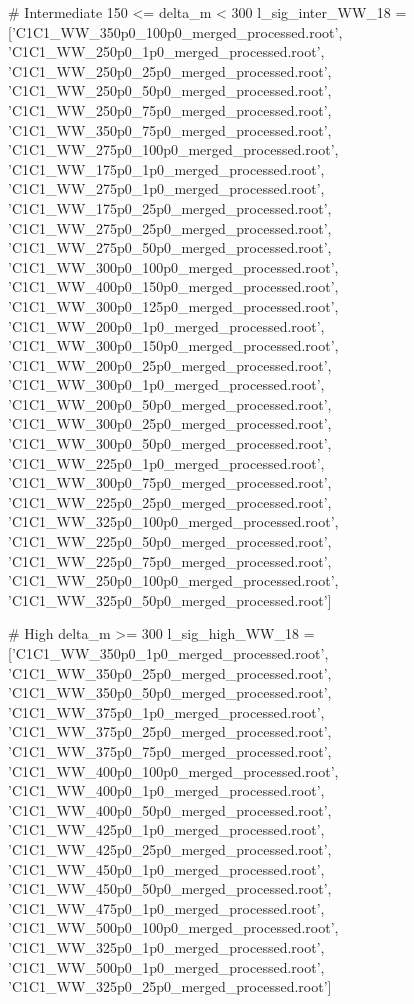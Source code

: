 # Intermediate 150 <= delta_m < 300
l_sig_inter_WW_18 = ['C1C1_WW_350p0_100p0_merged_processed.root',
                  'C1C1_WW_250p0_1p0_merged_processed.root',
                  'C1C1_WW_250p0_25p0_merged_processed.root',
                  'C1C1_WW_250p0_50p0_merged_processed.root',
                  'C1C1_WW_250p0_75p0_merged_processed.root',
                  'C1C1_WW_350p0_75p0_merged_processed.root',
                  'C1C1_WW_275p0_100p0_merged_processed.root',
                  'C1C1_WW_175p0_1p0_merged_processed.root',
                  'C1C1_WW_275p0_1p0_merged_processed.root',
                  'C1C1_WW_175p0_25p0_merged_processed.root',
                  'C1C1_WW_275p0_25p0_merged_processed.root',
                  'C1C1_WW_275p0_50p0_merged_processed.root',
                  'C1C1_WW_300p0_100p0_merged_processed.root',
                  'C1C1_WW_400p0_150p0_merged_processed.root',
                  'C1C1_WW_300p0_125p0_merged_processed.root',
                  'C1C1_WW_200p0_1p0_merged_processed.root',
                  'C1C1_WW_300p0_150p0_merged_processed.root',
                  'C1C1_WW_200p0_25p0_merged_processed.root',
                  'C1C1_WW_300p0_1p0_merged_processed.root',
                  'C1C1_WW_200p0_50p0_merged_processed.root',
                  'C1C1_WW_300p0_25p0_merged_processed.root',
                  'C1C1_WW_300p0_50p0_merged_processed.root',
                  'C1C1_WW_225p0_1p0_merged_processed.root',
                  'C1C1_WW_300p0_75p0_merged_processed.root',
                  'C1C1_WW_225p0_25p0_merged_processed.root',
                  'C1C1_WW_325p0_100p0_merged_processed.root',
                  'C1C1_WW_225p0_50p0_merged_processed.root',
                  'C1C1_WW_225p0_75p0_merged_processed.root',
                  'C1C1_WW_250p0_100p0_merged_processed.root',
                  'C1C1_WW_325p0_50p0_merged_processed.root']

# High delta_m >= 300
l_sig_high_WW_18 = ['C1C1_WW_350p0_1p0_merged_processed.root',
                 'C1C1_WW_350p0_25p0_merged_processed.root',
                 'C1C1_WW_350p0_50p0_merged_processed.root',
                 'C1C1_WW_375p0_1p0_merged_processed.root',
                 'C1C1_WW_375p0_25p0_merged_processed.root',
                 'C1C1_WW_375p0_75p0_merged_processed.root',
                 'C1C1_WW_400p0_100p0_merged_processed.root',
                 'C1C1_WW_400p0_1p0_merged_processed.root',
                 'C1C1_WW_400p0_50p0_merged_processed.root',
                 'C1C1_WW_425p0_1p0_merged_processed.root',
                 'C1C1_WW_425p0_25p0_merged_processed.root',
                 'C1C1_WW_450p0_1p0_merged_processed.root',
                 'C1C1_WW_450p0_50p0_merged_processed.root',
                 'C1C1_WW_475p0_1p0_merged_processed.root',
                 'C1C1_WW_500p0_100p0_merged_processed.root',
                 'C1C1_WW_325p0_1p0_merged_processed.root',
                 'C1C1_WW_500p0_1p0_merged_processed.root',
                 'C1C1_WW_325p0_25p0_merged_processed.root']


